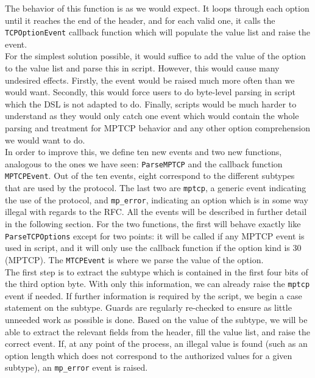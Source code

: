 The behavior of this function is as we would expect. It loops through each option until it reaches the end of the header, and for each valid one, it calls the \texttt{TCPOptionEvent} callback function which will populate the value list and raise the event. \\

For the simplest solution possible, it would suffice to add the value of the option to the value list and parse this in script. However, this would cause many undesired effects. Firstly, the event would be raised much more often than we would want. Secondly, this would force users to do byte-level parsing in script which the DSL is not adapted to do. Finally, scripts would be much harder to understand as they would only catch one event which would contain the whole parsing and treatment for MPTCP behavior and any other option comprehension we would want to do. \\

In order to improve this, we define ten new events and two new functions, analogous to the ones we have seen: \texttt{ParseMPTCP} and the callback function \texttt{MPTCPEvent}. Out of the ten events, eight correspond to the different subtypes that are used by the protocol. The last two are \texttt{mptcp}, a generic event indicating the use of the protocol, and \texttt{mp\_error}, indicating an option which is in some way illegal with regards to the RFC. All the events will be described in further detail in the following section. For the two functions, the first will behave exactly like \texttt{ParseTCPOptions} except for two points: it will be called if any MPTCP event is used in script, and it will only use the callback function if the option kind is 30 (MPTCP). The \texttt{MTCPEvent} is where we parse the value of the option. \\

The first step is to extract the subtype which is contained in the first four bits of the third option byte. With only this information, we can already raise the \texttt{mptcp} event if needed. If further information is required by the script, we begin a case statement on the subtype. Guards are regularly re-checked to ensure as little unneeded work as possible is done. Based on the value of the subtype, we will be able to extract the relevant fields from the header, fill the value list, and raise the correct event. If, at any point of the process, an illegal value is found (such as an option length which does not correspond to the authorized values for a given subtype), an \texttt{mp\_error} event is raised.

